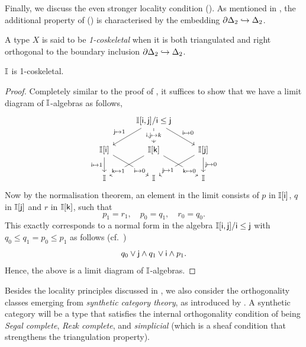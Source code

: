 Finally, we discuss the even stronger locality condition (\AxiomOneCS). As mentioned in , the additional property of (\AxiomOneCS) is characterised by the embedding $\partial\Delta_2 \hookrightarrow \Delta_2$.

\begin{definition}
  A type $X$ is said to be \emph{1-coskeletal} when it is both triangulated and right orthogonal to the boundary inclusion $\partial\Delta_2 \hookrightarrow \Delta_2$.
\end{definition}

\begin{proposition}[\AxiomSQCF]\label{specis1t}
  $\mathbb{I}$ is 1-coskeletal.
\end{proposition}
\begin{proof}
  Completely similar to the proof of , it suffices to show that we have a limit diagram of $\mathbb{I}$-algebras as follows,
  \[\begin{tikzcd}
    & {\I[\ms{i},\ms{j}]/\ms{i}\le \ms{j}} \\
    \I[\ms{i}] & \I[\ms{k}] & \I[\ms{j}] \\
    \I & \I & \I
    \arrow["{\ms{j} \mapsto 1}"', from=1-2, to=2-1]
    \arrow["{\ms{i},\ms{j} \mapsto k}"{description}, from=1-2, to=2-2]
    \arrow["{\ms{i}\mapsto 0}", from=1-2, to=2-3]
    \arrow["\ms{i}\mapsto 1"', from=2-1, to=3-1]
    \arrow["\ms{i}\mapsto 0"{description, pos=0.75}, from=2-1, to=3-2]
    \arrow["\ms{k}\mapsto 1"{description, pos=0.75}, from=2-2, to=3-1]
    \arrow["\ms{k}\mapsto 0"{description, pos=0.75}, from=2-2, to=3-3]
    \arrow["\ms{j}\mapsto 1"{description, pos=0.75}, from=2-3, to=3-2]
    \arrow["\ms{j}\mapsto 0", from=2-3, to=3-3]
  \end{tikzcd}\]
  Now by the normalisation theorem, an element in the limit consists of $p$ in $\mathbb{I}[\mathsf{i}]$, $q$ in $\mathbb{I}[\mathsf{j}]$ and $r$ in $\mathbb{I}[\mathsf{k}]$, such that
  \[ p_1 = r_1, \quad p_0 = q_1, \quad r_0 = q_0\text{.} \]
  This exactly corresponds to a normal form in the algebra $\mathbb{I}[\mathsf{i},\mathsf{j}]/\mathsf{i}\le\mathsf{j}$ with $q_0 \le q_1 = p_0 \le p_1$ as follows (cf.\ )
  \[ q_0 \vee \ms{j} \wedge q_1 \vee \ms{i} \wedge p_1\text{.} \]
  Hence, the above is a limit diagram of $\mathbb{I}$-algebras.
\end{proof}

Besides the locality principles discussed in , we also consider the orthogonality classes emerging from \emph{synthetic category theory}, as introduced by \citet{riehl2017type}. 
A synthetic category will be a type that satisfies the internal orthogonality condition of being \emph{Segal complete}, \emph{Rezk complete}, and \emph{simplicial} (which is a sheaf condition that strengthens the triangulation property).

